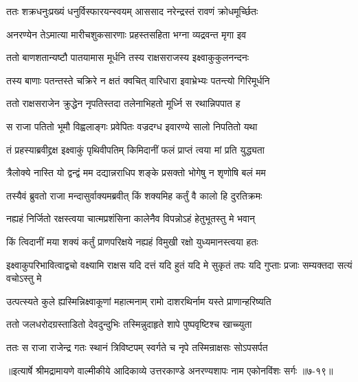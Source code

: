 \twolineshloka
{ततः शक्रधनुःप्रख्यं धनुर्विस्फारयन्स्वयम्}
{आससाद नरेन्द्रस्तं रावणं क्रोधमूर्च्छितः} %

\twolineshloka
{अनरण्येन तेऽमात्या मारीचशुकसारणाः}
{प्रहस्तसहिता भग्ना व्यद्रवन्त मृगा इव} %

\twolineshloka
{ततो बाणशतान्यष्टौ पातयामास मूर्धनि}
{तस्य राक्षसराजस्य इक्ष्वाकुकुलनन्दनः} %

\twolineshloka
{तस्य बाणाः पतन्तस्ते चक्रिरे न क्षतं क्वचित्}
{वारिधारा इवाभ्रेभ्यः पतन्त्यो गिरिमूर्धनि} %

\twolineshloka
{ततो राक्षसराजेन क्रुद्धेन नृपतिस्तदा}
{तलेनाभिहतो मूर्ध्नि स रथान्निपपात ह} %

\twolineshloka
{स राजा पतितो भूमौ विह्वलाङ्गः प्रवेपितः}
{वज्रदग्ध इवारण्ये सालो निपतितो यथा} %

\twolineshloka
{तं प्रहस्याब्रवीद्द्रक्ष इक्ष्वाकुं पृथिवीपतिम्}
{किमिदानीं फलं प्राप्तं त्वया मां प्रति युद्ध्यता} %

\twolineshloka
{त्रैलोक्ये नास्ति यो द्वन्द्वं मम दद्यान्नराधिप}
{शङ्के प्रसक्तो भोगेषु न शृणोषि बलं मम} %

\twolineshloka
{तस्यैवं ब्रुवतो राजा मन्दासुर्वाक्यमब्रवीत्}
{किं शक्यमिह कर्तुं वै कालो हि दुरतिक्रमः} %

\twolineshloka
{नह्यहं निर्जितो रक्षस्त्वया चात्मप्रशंसिना}
{कालेनैव विपन्नोऽहं हेतुभूतस्तु मे भवान्} %

\twolineshloka
{किं त्विदानीं मया शक्यं कर्तुं प्राणपरिक्षये}
{नह्यहं विमुखी रक्षो युध्यमानस्त्वया हतः} %

\twolineshloka
{इक्ष्वाकुपरिभावित्वाद्वचो वक्ष्यामि राक्षस}
{यदि दत्तं यदि हुतं यदि मे सुकृतं तपः यदि गुप्ताः प्रजाः सम्यक्तदा सत्यं वचोऽस्तु मे} %

\twolineshloka
{उत्पत्स्यते कुले ह्यस्मिन्निक्ष्वाकूणां महात्मनाम्}
{रामो दाशरथिर्नाम यस्ते प्राणान्हरिष्यति} %

\twolineshloka
{ततो जलधरोदग्रस्ताडितो देवदुन्दुभिः}
{तस्मिन्नुदाहृते शापे पुष्पवृष्टिश्च खाच्च्युता} %

\twolineshloka
{ततः स राजा राजेन्द्र गतः स्थानं त्रिविष्टपम्}
{स्वर्गते च नृपे तस्मिन्राक्षसः सोऽपसर्पत} %


॥इत्यार्षे श्रीमद्रामायणे वाल्मीकीये आदिकाव्ये उत्तरकाण्डे अनरण्यशापः नाम एकोनविंशः सर्गः ॥७-१९॥
